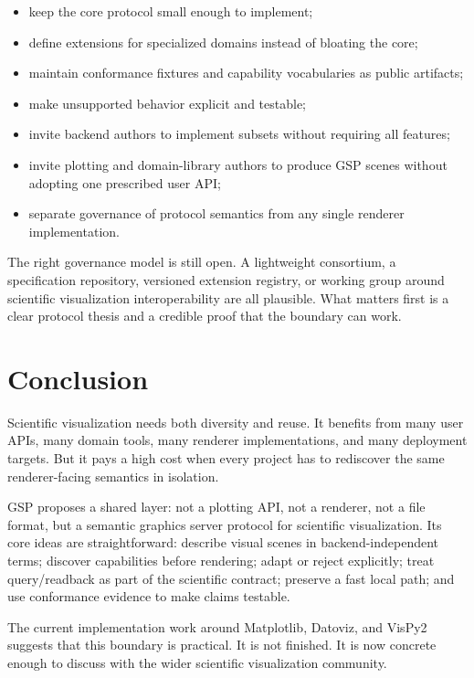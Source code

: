 \documentclass[a4paper,11pt]{article}
\newcommand{\gsp}{GSP\xspace}
\newcommand{\vispytwo}{VisPy2\xspace}
\newcommand{\datoviz}{Datoviz\xspace}
\newcommand{\matplotlib}{Matplotlib\xspace}
\begin{document}
\begin{itemize}
  \item keep the core protocol small enough to implement;
  \item define extensions for specialized domains instead of bloating the core;
  \item maintain conformance fixtures and capability vocabularies as public artifacts;
  \item make unsupported behavior explicit and testable;
  \item invite backend authors to implement subsets without requiring all features;
  \item invite plotting and domain-library authors to produce \gsp scenes without adopting one
  prescribed user API;
  \item separate governance of protocol semantics from any single renderer implementation.
\end{itemize}

The right governance model is still open. A lightweight consortium, a specification repository,
versioned extension registry, or working group around scientific visualization interoperability are
all plausible. What matters first is a clear protocol thesis and a credible proof that the boundary
can work.

\section{Conclusion}

Scientific visualization needs both diversity and reuse. It benefits from many user APIs, many
domain tools, many renderer implementations, and many deployment targets. But it pays a high cost
when every project has to rediscover the same renderer-facing semantics in isolation.

\gsp proposes a shared layer: not a plotting API, not a renderer, not a file format, but a semantic
graphics server protocol for scientific visualization. Its core ideas are straightforward:
describe visual scenes in backend-independent terms; discover capabilities before rendering;
adapt or reject explicitly; treat query/readback as part of the scientific contract; preserve a fast
local path; and use conformance evidence to make claims testable.

The current implementation work around \matplotlib, \datoviz, and \vispytwo suggests that this
boundary is practical. It is not finished. It is now concrete enough to discuss with the wider
scientific visualization community.



\end{document}

